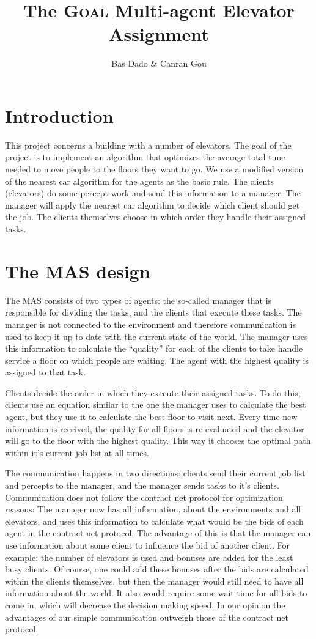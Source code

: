 \documentclass[a4paper,11pt,twocolumn]{article}
\title{The \textsc{Goal} Multi-agent Elevator Assignment}
\author{Bas Dado \& Canran Gou}
\begin{document}
\maketitle

\section{Introduction}
This project concerns a building with a number of elevators. The goal of the project is to implement an algorithm that optimizes the average total time needed to move people to the floors they want to go. We use a modified version of the nearest car algorithm for the agents as the basic rule. The clients (elevators) do some percept work and send this information to a manager. The manager will apply the nearest car algorithm to decide which client should get the job.
The clients themselves choose in which order they handle their assigned tasks.

\section{The MAS design}
The MAS consists of two types of agents: the so-called manager that is responsible for dividing the tasks, and the clients that execute these tasks. The manager is not connected to the environment and therefore communication is used to keep it up to date with the current state of the world. The manager uses this information  to calculate the ``quality'' for each of the clients to take handle service a floor on which people are waiting. The agent with the highest quality is assigned to that task. 

Clients decide the order in which they execute their assigned tasks. To do this, clients use an equation similar to the one the manager uses to calculate the best agent, but they use it to calculate the best floor to visit next. Every time new information is received, the quality for all floors is re-evaluated and the elevator will go to the floor with the highest quality. This way it chooses the optimal path within it's current job list at all times.

The communication happens in two directions: clients send their current job list and percepts to the manager, and the manager sends tasks to it's clients. Communication does not follow the contract net protocol for optimization reasons: The manager now has all information, about the environments and all elevators, and uses this information to calculate what would be the bids of each agent in the contract net protocol. The advantage of this is that the manager can use information about some client to influence the bid of another client. For example: the number of elevators is used and bonuses are added for the least busy clients. Of course, one could add these bonuses after the bids are calculated within the clients themselves, but then the manager would still need to have all information about the world. It also would require some wait time for all bids to come in, which will decrease the decision making speed. In our opinion the advantages of our simple communication outweigh those of the contract net protocol.
\end{document}
